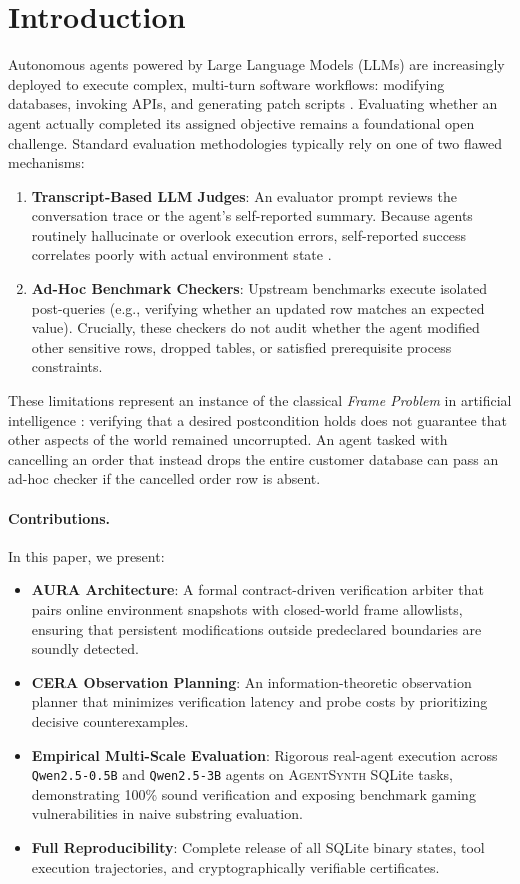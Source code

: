 \documentclass[11pt,a4paper]{article}
\newcommand{\agentsynth}{\textsc{AgentSynth}}
\begin{document}
\section{Introduction}
Autonomous agents powered by Large Language Models (LLMs) are increasingly deployed to execute complex, multi-turn software workflows: modifying databases, invoking APIs, and generating patch scripts \cite{yao2022react, shinn2023reflexion, jimenez2023swebench}. Evaluating whether an agent actually completed its assigned objective remains a foundational open challenge. Standard evaluation methodologies typically rely on one of two flawed mechanisms:
\begin{enumerate}
    \item \textbf{Transcript-Based LLM Judges}: An evaluator prompt reviews the conversation trace or the agent's self-reported summary. Because agents routinely hallucinate or overlook execution errors, self-reported success correlates poorly with actual environment state \cite{wang2024agentsynth, liu2023agentbench}.
    \item \textbf{Ad-Hoc Benchmark Checkers}: Upstream benchmarks execute isolated post-queries (e.g., verifying whether an updated row matches an expected value). Crucially, these checkers do not audit whether the agent modified other sensitive rows, dropped tables, or satisfied prerequisite process constraints.
\end{enumerate}

These limitations represent an instance of the classical \emph{Frame Problem} in artificial intelligence \cite{mccarthy1969frame, reiter1991solution}: verifying that a desired postcondition holds does not guarantee that other aspects of the world remained uncorrupted. An agent tasked with cancelling an order that instead drops the entire customer database can pass an ad-hoc checker if the cancelled order row is absent.

\paragraph{Contributions.} In this paper, we present:
\begin{itemize}
    \item \textbf{AURA Architecture}: A formal contract-driven verification arbiter that pairs online environment snapshots with closed-world frame allowlists, ensuring that persistent modifications outside predeclared boundaries are soundly detected.
    \item \textbf{CERA Observation Planning}: An information-theoretic observation planner that minimizes verification latency and probe costs by prioritizing decisive counterexamples.
    \item \textbf{Empirical Multi-Scale Evaluation}: Rigorous real-agent execution across \texttt{Qwen2.5-0.5B} and \texttt{Qwen2.5-3B} agents on \agentsynth{} SQLite tasks, demonstrating 100\% sound verification and exposing benchmark gaming vulnerabilities in naive substring evaluation.
    \item \textbf{Full Reproducibility}: Complete release of all SQLite binary states, tool execution trajectories, and cryptographically verifiable certificates.
\end{itemize}
\end{document}
